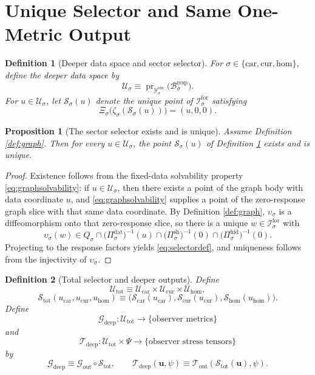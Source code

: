 \documentclass[11pt]{article}
\newcommand{\Car}{\mathrm{car}}
\newcommand{\Cur}{\mathrm{cur}}
\newcommand{\Hom}{\mathrm{hom}}
\newcommand{\ForSpace}[1]{\mathcal I_{#1}^{\mathrm{for}}}
\newcommand{\MetricOut}{\mathscr G_{\mathrm{out}}}
\newcommand{\MatterOut}{\mathscr T_{\mathrm{out}}}
\newcommand{\DeepMetricOut}{\mathscr G_{\mathrm{deep}}}
\newcommand{\DeepMatterOut}{\mathscr T_{\mathrm{deep}}}
\newcommand{\DataSpace}[1]{\mathcal Y_{#1}^{\mathrm{obs}}}
\newcommand{\ResponseMap}[1]{\Xi_{#1}}
\newcommand{\ResponseImage}[1]{\mathcal B_{#1}^{\mathrm{resp}}}
\newcommand{\ProtoEmbed}[1]{\zeta_{#1}}
\newcommand{\GraphBody}[1]{Q_{#1}}
\newcommand{\GraphDataProj}[1]{\Pi_{#1}^{\mathrm{dat}}}
\newcommand{\GraphShellProj}[1]{\Pi_{#1}^{\mathrm{sh}}}
\newcommand{\GraphHiddenProj}[1]{\Pi_{#1}^{\mathrm{hid}}}
\newcommand{\GraphEmbed}[1]{\upsilon_{#1}}
\newcommand{\DeepSpace}[1]{\mathcal U_{#1}}
\newcommand{\ChainSelect}[1]{\mathcal S_{#1}}
\newcommand{\DeepShell}{\mathcal U_{\mathrm{tot}}}
\newcommand{\ChainSelectTriple}{\mathcal S_{\mathrm{tot}}}
\newtheorem{definition}{Definition}
\newtheorem{proposition}{Proposition}
\begin{document}
\section{Unique Selector and Same One-Metric Output}

\begin{definition}[Deeper data space and sector selector]
\label{def:selector}
For \(\sigma\in\{\Car,\Cur,\Hom\}\), define the deeper data space by
\[
\DeepSpace{\sigma}
\equiv
\operatorname{pr}_{\DataSpace{\sigma}}\bigl(\ResponseImage{\sigma}\bigr).
\]
For \(u\in \DeepSpace{\sigma}\), let \(\ChainSelect{\sigma}(u)\) denote the unique point of \(\ForSpace{\sigma}\) satisfying
\begin{equation}
\ResponseMap{\sigma}\bigl(\ProtoEmbed{\sigma}(\ChainSelect{\sigma}(u))\bigr)
=(u,0,0).
\label{eq:selectordef}
\end{equation}
\end{definition}

\begin{proposition}[The sector selector exists and is unique]
\label{prop:selector}
Assume Definition \ref{def:graph}. Then for every \(u\in \DeepSpace{\sigma}\), the point \(\ChainSelect{\sigma}(u)\) of Definition \ref{def:selector} exists and is unique.
\end{proposition}

\begin{proof}
Existence follows from the fixed-data solvability property \eqref{eq:graphsolvability}: if \(u\in\DeepSpace{\sigma}\), then there exists a point of the graph body with data coordinate \(u\), and \eqref{eq:graphsolvability} supplies a point of the zero-response graph slice with that same data coordinate. By Definition \ref{def:graph}, \(\GraphEmbed{\sigma}\) is a diffeomorphism onto that zero-response slice, so there is a unique \(w\in\ForSpace{\sigma}\) with
\[
\GraphEmbed{\sigma}(w)\in
\GraphBody{\sigma}\cap
\bigl(\GraphDataProj{\sigma}\bigr)^{-1}(u)\cap
\bigl(\GraphShellProj{\sigma}\bigr)^{-1}(0)\cap
\bigl(\GraphHiddenProj{\sigma}\bigr)^{-1}(0).
\]
Projecting to the response factors yields \eqref{eq:selectordef}, and uniqueness follows from the injectivity of \(\GraphEmbed{\sigma}\).
\end{proof}

\begin{definition}[Total selector and deeper outputs]
\label{def:deepoutputs}
Define
\[
\DeepShell
\equiv
\DeepSpace{\Car}\times\DeepSpace{\Cur}\times\DeepSpace{\Hom},
\]
\[
\ChainSelectTriple(u_{\Car},u_{\Cur},u_{\Hom})
\equiv
\bigl(
\ChainSelect{\Car}(u_{\Car}),
\ChainSelect{\Cur}(u_{\Cur}),
\ChainSelect{\Hom}(u_{\Hom})
\bigr).
\]
Define
\[
\DeepMetricOut:\DeepShell\to\{\text{observer metrics}\}
\]
and
\[
\DeepMatterOut:\DeepShell\times\Psi\to\{\text{observer stress tensors}\}
\]
by
\begin{equation}
\DeepMetricOut
\equiv
\MetricOut\circ\ChainSelectTriple,
\qquad
\DeepMatterOut(\mathbf u,\psi)
\equiv
\MatterOut(\ChainSelectTriple(\mathbf u),\psi).
\label{eq:deepoutputs}
\end{equation}
\end{definition}
\end{document}
